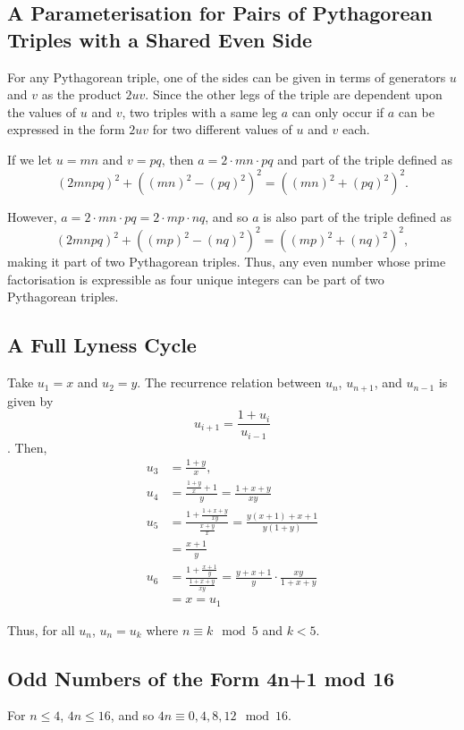 \documentclass[11pt]{article}
\begin{document}
\begin{appendices}
\subsection{A Parameterisation for Pairs of Pythagorean Triples with a Shared Even Side}

For any Pythagorean triple, one of the sides can be given in terms of generators $u$ and $v$ as the product $2uv$. Since the other legs of the triple are dependent upon the values of $u$ and $v$, two triples with a same leg $a$ can only occur if $a$ can be expressed in the form $2uv$ for two different values of $u$ and $v$ each. 

If we let $u=mn$ and $v=pq$, then $a=2\cdot{mn}\cdot{pq}$ and part of the triple defined as
$$(2mnpq)^2+((mn)^2-(pq)^2)^2=((mn)^2+(pq)^2)^2.$$

However, $a=2\cdot{mn}\cdot{pq}=2\cdot{mp}\cdot{nq}$, and so $a$ is also part of the triple defined as
$$(2mnpq)^2+((mp)^2-(nq)^2)^2=((mp)^2+(nq)^2)^2,$$
making it part of two Pythagorean triples. Thus, any even number whose prime factorisation is expressible as four unique integers can be part of two Pythagorean triples.

\subsection{A Full Lyness Cycle}
Take $u_1=x$ and $u_2=y$. The recurrence relation between $u_n$, $u_{n+1}$, and $u_{n-1}$ is given by
$$u_{i+1}=\frac{1+u_i}{u_{i-1}}$$.
Then,
\begin{equation*}
\begin{aligned}
u_3&=\frac{1+y}{x}, \\
u_4&=\frac{\frac{1+y}{x}+1}{y}=\frac{1+x+y}{xy}\\
u_5&=\frac{1+\frac{1+x+y}{xy}}{\frac{x+y}{x}}=\frac{y(x+1)+x+1}{y(1+y)}\\
&=\frac{x+1}{y} \\
u_6&=\frac{1+\frac{x+1}{y}}{\frac{1+x+y}{xy}}=\frac{y+x+1}{y}\cdot\frac{xy}{1+x+y}\\
&=x=u_1
\end{aligned}
\end{equation*}

Thus, for all $u_n$, $u_n=u_k$ where $n\equiv{k}\mod 5$ and $k<5$.

\subsection{Odd Numbers of the Form 4n+1 mod 16}
For $n\leq{4}$, $4n\leq{16}$, and so $4n\equiv{0,4,8,12}\mod{16}$.


\end{appendices}
\end{document}
